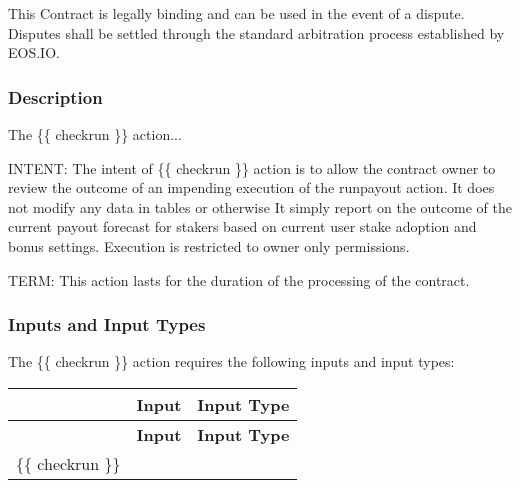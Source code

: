 This Contract is legally binding and can be used in the event of a dispute. Disputes shall be settled through the standard arbitration process established by E\+O\+S.\+IO.

\subsubsection*{Description}

The {\ttfamily \{\{ checkrun \}\}} action...

I\+N\+T\+E\+NT\+: The intent of {\ttfamily \{\{ checkrun \}\}} action is to allow the contract owner to review the outcome of an impending execution of the runpayout action. It does not modify any data in tables or otherwise It simply report on the outcome of the current payout forecast for stakers based on current user stake adoption and bonus settings. Execution is restricted to owner only permissions.

T\+E\+RM\+: This action lasts for the duration of the processing of the contract.

\subsubsection*{Inputs and Input Types}

The {\ttfamily \{\{ checkrun \}\}} action requires the following {\ttfamily inputs} and {\ttfamily input types}\+:

\tabulinesep=1mm
\begin{longtabu} spread 0pt [c]{*3{|X[-1]}|}
\hline
{}&{\bf Input }&{\bf Input Type  }\\
\endfirsthead
\hline
\endfoot
\hline
{}&{\bf Input }&{\bf Input Type  }\\
\endhead
{\ttfamily \{\{ checkrun \}\}} &&\\
\end{longtabu}
